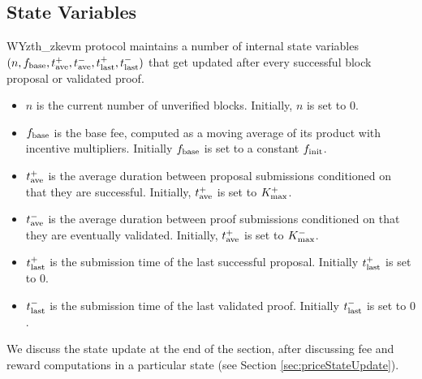 \documentclass[9pt,oneside]{amsart}
\begin{document}
\begin{multicols}{2}

\subsection{State Variables}
WYzth_zkevm protocol maintains a number of internal state variables $(n, f_\textnormal{base}, t^+_\textnormal{ave}, t^-_\textnormal{ave}, t^+_\textnormal{last}, t^-_\textnormal{last})$ that get updated after every successful block proposal or validated proof.
\begin{itemize}
    \item $n$ is the current number of unverified blocks. Initially, $n$ is set to $0$.
    \item $f_\textnormal{base}$ is the base fee, computed as a moving average of its product with incentive multipliers. Initially $f_\textnormal{base}$ is set to a constant $f_\textnormal{init}$.
    \item $t^+_\textnormal{ave}$ is the average duration between proposal submissions conditioned on that they are successful. Initially, $t^+_\textnormal{ave}$ is set to $K_\textnormal{max}^+$.
    \item $t^-_\textnormal{ave}$ is the average duration between proof submissions conditioned on that they are eventually validated. Initially, $t^+_\textnormal{ave}$ is set to $K_\textnormal{max}^-$.
    \item $t^+_\textnormal{last}$ is the submission time of the last successful proposal. Initially $t^+_\textnormal{last}$ is set to $0$.
    \item $t^-_\textnormal{last}$ is the submission time of the last validated proof. Initially $t^-_\textnormal{last}$ is set to $0$. 
\end{itemize}
We discuss the state update at the end of the section, after discussing fee and reward computations in a particular state (see Section \ref{sec:priceStateUpdate}). 





\end{multicols}
\end{document}
